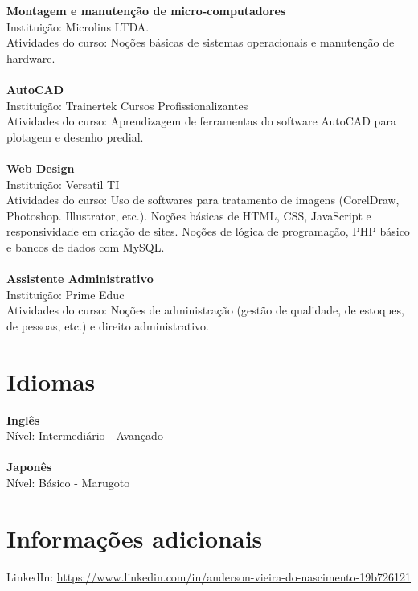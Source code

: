 \documentclass[11pt]{article}
\begin{document}
\textbf{Montagem e manutenção de micro-computadores}\\
Instituição: Microlins LTDA.\\
Atividades do curso: Noções básicas de sistemas operacionais e manutenção de 	hardware.\\
\\
\textbf{AutoCAD}\\
Instituição: Trainertek Cursos Profissionalizantes\\
Atividades do curso: Aprendizagem de ferramentas do software AutoCAD para plotagem e desenho predial.\\
\\
\textbf{Web Design}\\
Instituição: Versatil TI\\
Atividades do curso: Uso de softwares para tratamento de imagens (CorelDraw, Photoshop. Illustrator,
etc.). Noções básicas de HTML, CSS, JavaScript e responsividade em criação de sites. Noções de
lógica de programação, PHP básico e bancos de dados com MySQL.\\
\\
\textbf{Assistente Administrativo}\\
Instituição: Prime Educ\\
Atividades do curso: Noções de administração (gestão de qualidade, de estoques, de pessoas, etc.) e
direito administrativo.\\

\section{Idiomas}

\textbf{Inglês} \\
Nível: Intermediário - Avançado\\
\\
\textbf{Japonês}\\
Nível: Básico - Marugoto

\section{Informações adicionais}

LinkedIn: \url{https://www.linkedin.com/in/anderson-vieira-do-nascimento-19b726121}
\end{document}
